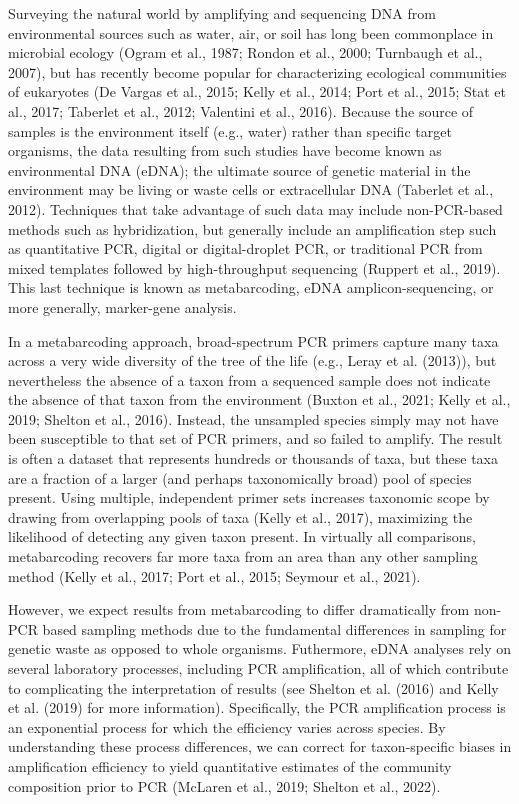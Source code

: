\documentclass[
]{article}
\begin{document}
Surveying the natural world by amplifying and sequencing DNA from
environmental sources such as water, air, or soil has long been
commonplace in microbial ecology (Ogram et al., 1987; Rondon et al.,
2000; Turnbaugh et al., 2007), but has recently become popular for
characterizing ecological communities of eukaryotes (De Vargas et al.,
2015; Kelly et al., 2014; Port et al., 2015; Stat et al., 2017; Taberlet
et al., 2012; Valentini et al., 2016). Because the source of samples is
the environment itself (e.g., water) rather than specific target
organisms, the data resulting from such studies have become known as
environmental DNA (eDNA); the ultimate source of genetic material in the
environment may be living or waste cells or extracellular DNA (Taberlet
et al., 2012). Techniques that take advantage of such data may include
non-PCR-based methods such as hybridization, but generally include an
amplification step such as quantitative PCR, digital or digital-droplet
PCR, or traditional PCR from mixed templates followed by high-throughput
sequencing (Ruppert et al., 2019). This last technique is known as
metabarcoding, eDNA amplicon-sequencing, or more generally, marker-gene
analysis.

In a metabarcoding approach, broad-spectrum PCR primers capture many
taxa across a very wide diversity of the tree of the life (e.g., Leray
et al. (2013)), but nevertheless the absence of a taxon from a sequenced
sample does not indicate the absence of that taxon from the environment
(Buxton et al., 2021; Kelly et al., 2019; Shelton et al., 2016).
Instead, the unsampled species simply may not have been susceptible to
that set of PCR primers, and so failed to amplify. The result is often a
dataset that represents hundreds or thousands of taxa, but these taxa
are a fraction of a larger (and perhaps taxonomically broad) pool of
species present. Using multiple, independent primer sets increases
taxonomic scope by drawing from overlapping pools of taxa (Kelly et al.,
2017), maximizing the likelihood of detecting any given taxon present.
In virtually all comparisons, metabarcoding recovers far more taxa from
an area than any other sampling method (Kelly et al., 2017; Port et al.,
2015; Seymour et al., 2021).

However, we expect results from metabarcoding to differ dramatically
from non-PCR based sampling methods due to the fundamental differences
in sampling for genetic waste as opposed to whole organisms. Futhermore,
eDNA analyses rely on several laboratory processes, including PCR
amplification, all of which contribute to complicating the
interpretation of results (see Shelton et al. (2016) and Kelly et al.
(2019) for more information). Specifically, the PCR amplification
process is an exponential process for which the efficiency varies across
species. By understanding these process differences, we can correct for
taxon-specific biases in amplification efficiency to yield quantitative
estimates of the community composition prior to PCR (McLaren et al.,
2019; Shelton et al., 2022).
\end{document}
